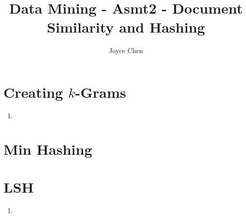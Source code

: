 \documentclass[11pt]{article}
\title{Data Mining - Asmt2 - Document Similarity and Hashing}
\author{Joyce Chen}
\begin{document}
\maketitle

\section{Creating $k$-Grams}
\begin{enumerate}[label=\Alph*]
\item


\end{enumerate}

\section{Min Hashing}

\section{LSH}
\begin{enumerate}[label=\Alph*]
\item


\end{enumerate}
\end{document}

